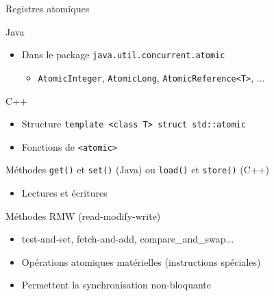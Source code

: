 \mode*

\begin{frame}[fragile]{Registres atomiques}
  \vspace{-2mm}
  \begin{exampleblock}{Java}
  \begin{itemize}
    \item Dans le package \lstinline{java.util.concurrent.atomic}
  \begin{itemize}
    \item \lstinline{AtomicInteger}, \lstinline{AtomicLong}, \lstinline{AtomicReference<T>}, ...
  \end{itemize}
  \end{itemize}
  \end{exampleblock}
  \vspace{-2mm}
  \begin{exampleblock}{C++}
  \begin{itemize}
    \item Structure \lstinline{template <class T> struct std::atomic} 
    \item Fonctions de \lstinline{<atomic>}
  \end{itemize}
 \end{exampleblock}
  \begin{alertblock}{Méthodes \lstinline{get()} et \lstinline{set()} (Java) ou \lstinline{load()} et \lstinline{store()} (C++)}
  \begin{itemize}
    \item Lectures et écritures 
  \end{itemize}
  \end{alertblock}
  \begin{block}{Méthodes RMW (read-modify-write)}
    \begin{itemize}
    \item test-and-set, fetch-and-add, compare\_and\_swap...
    \item Opérations atomiques matérielles (instructions spéciales)
    \item Permettent la synchronisation non-bloquante
    \end{itemize}
  \end{block}
\end{frame}


